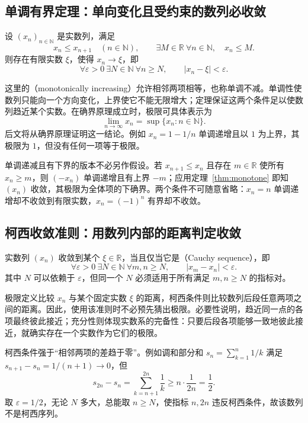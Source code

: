 \documentclass[UTF8,12pt,a4paper,fontset=fandol,oneside]{ctexart}
\begin{document}
\subsection{单调有界定理：单向变化且受约束的数列必收敛}

\begin{theorem}[单调有界定理]
  \label{thm:monotone}
  设 $(x_n)_{n\in\mathbb N}$ 是实数列，满足
  \[
    x_n\leq x_{n+1}\quad(n\in\mathbb N),
    \qquad \exists M\in\mathbb R\ \forall n\in\mathbb N,
    \quad x_n\leq M.
  \]
  则存在有限实数 $\xi$，使得 $x_n\to\xi$，即
  \[
    \forall\varepsilon>0\ \exists N\in\mathbb N\ \forall n\geq N,
    \qquad |x_n-\xi|<\varepsilon.
  \]
\end{theorem}

这里的（monotonically increasing）允许相邻两项相等，也称单调不减。单调性使数列只能向一个方向变化，上界使它不能无限增大；定理保证这两个条件足以使数列趋近某个实数。在确界原理成立时，极限可具体表示为
\[
  \lim_{n\to\infty}x_n=\sup\{x_n:n\in\mathbb N\}.
\]
后文将从确界原理证明这一结论。例如 $x_n=1-1/n$ 单调递增且以 $1$ 为上界，其极限为 $1$，但没有任何一项等于极限。

单调递减且有下界的版本不必另作假设。若 $x_{n+1}\leq x_n$ 且存在 $m\in\mathbb R$ 使所有 $x_n\geq m$，则 $(-x_n)$ 单调递增且有上界 $-m$；应用定理~\ref{thm:monotone} 即知 $(x_n)$ 收敛，其极限为全体项的下确界。两个条件不可随意省略：$x_n=n$ 单调递增却不收敛到有限实数，$x_n=(-1)^n$ 有界却不收敛。

\subsection{柯西收敛准则：用数列内部的距离判定收敛}

\begin{theorem}[柯西收敛准则]
  \label{thm:cauchy}
  实数列 $(x_n)$ 收敛到某个 $\xi\in\mathbb R$，当且仅当它是（Cauchy sequence），即
  \[
    \forall\varepsilon>0\ \exists N\in\mathbb N\ \forall m,n\geq N,
    \qquad |x_m-x_n|<\varepsilon.
  \]
  其中 $N$ 可以依赖于 $\varepsilon$，但同一个 $N$ 必须适用于所有满足 $m,n\geq N$ 的指标对。
\end{theorem}

极限定义比较 $x_n$ 与某个固定实数 $\xi$ 的距离，柯西条件则比较数列后段任意两项之间的距离。因此，使用该准则时不必预先猜出极限。必要性说明，趋近同一点的各项最终彼此接近；充分性则体现实数系的完备性：只要后段各项能够一致地彼此接近，就确实存在一个实数作为它们的极限。

\begin{samepage}
柯西条件强于“相邻两项的差趋于零”。例如调和部分和 $s_n=\sum_{k=1}^{n}1/k$ 满足 $s_{n+1}-s_n=1/(n+1)\to0$，但
\[
  s_{2n}-s_n=\sum_{k=n+1}^{2n}\frac1k
  \geq n\cdot\frac1{2n}=\frac12.
\]
取 $\varepsilon=1/2$，无论 $N$ 多大，总能取 $n\geq N$，使指标 $n,2n$ 违反柯西条件，故该数列不是柯西序列。
\end{samepage}
\end{document}
